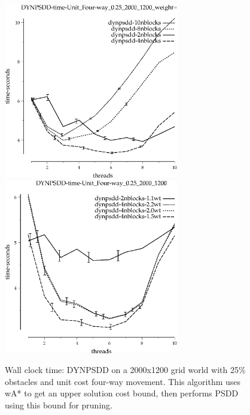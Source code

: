 \documentclass{article}
\begin{document}
\begin{appendices}
\begin{figure}[h]
\begin{center}
\includegraphics[width=3in]{../graphs/grid_unit_four-way_0.25_2000_1200/DYNPSDD-time-Unit_Four-way_0.25_2000_1200_weight=2.2.eps}
\includegraphics[width=3in]{../graphs/grid_unit_four-way_0.25_2000_1200/DYNPSDD-time-Unit_Four-way_0.25_2000_1200.eps}
\caption{Wall clock time: DYNPSDD on a 2000x1200 grid world with 25\%
  obstacles and unit cost four-way movement.  This algorithm uses wA*
  to get an upper solution cost bound, then performs PSDD using this
  bound for pruning.}
\end{center}
\end{figure}


\end{appendices}
\end{document}
